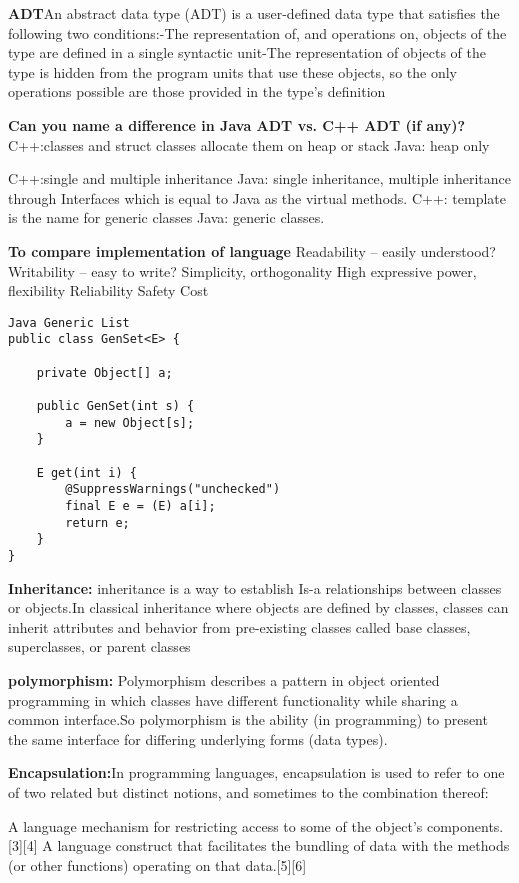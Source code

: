 \documentclass{article}
\begin{document}
\textbf{ADT}An abstract data type (ADT) is a user-defined data type that satisfies the following two conditions:-The representation of, and operations on, objects of the type are defined in a single syntactic unit-The representation of objects of the type is hidden from the program units that use these objects, so the only operations possible are those provided in the type's definition

\textbf{Can you name a difference in Java ADT vs. C++ ADT (if any)?}
C++:classes and struct classes allocate them on heap or stack
Java: heap only

C++:single and multiple inheritance
Java: single inheritance, multiple inheritance through Interfaces which is equal to Java as the virtual methods.
 C++: template is the name for generic classes
 Java: generic classes.

\textbf{To compare implementation of language}
Readability – easily understood?
Writability – easy to write?
Simplicity, orthogonality
High expressive power, flexibility
Reliability
Safety
Cost 

\begin{lstlisting}
Java Generic List
public class GenSet<E> {

    private Object[] a;

    public GenSet(int s) {
        a = new Object[s];
    }

    E get(int i) {
        @SuppressWarnings("unchecked")
        final E e = (E) a[i];
        return e;
    }
}
\end{lstlisting}

\textbf{Inheritance:} inheritance is a way to establish Is-a relationships between classes or objects.In classical inheritance where objects are defined by classes, classes can inherit attributes and behavior from pre-existing classes called base classes, superclasses, or parent classes

\textbf{polymorphism:} Polymorphism describes a pattern in object oriented programming in which classes have different functionality while sharing a common interface.So polymorphism is the ability (in programming) to present the same interface for differing underlying forms (data types).

\textbf{Encapsulation:}In programming languages, encapsulation is used to refer to one of two related but distinct notions, and sometimes to the combination thereof:

A language mechanism for restricting access to some of the object's components.[3][4]
A language construct that facilitates the bundling of data with the methods (or other functions) operating on that data.[5][6]
\end{document}
